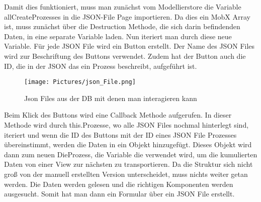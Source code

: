 \documentclass[a4paper,11pt]{scrreprt}
\begin{document}
Damit dies funktioniert, muss man zunächst vom Modellierstore die Variable allCreateProzesses in die JSON-File Page importieren. Da dies ein MobX Array ist, muss zunächst über die Destruction Methode, die sich darin befindenden Daten, in eine separate Variable laden. Nun iteriert man durch diese neue Variable. Für jede JSON File wird ein Button erstellt. Der Name des JSON Files wird zur Beschriftung des Buttons verwendet. 
Zudem hat der Button auch die ID, die in der JSON das ein Prozess beschreibt, aufgeführt ist. 
\begin{figure}[ht]
\centering
\texttt{[image: Pictures/json\_File.png]}
\caption{Json Files aus der DB mit denen man interagieren kann}
\label{JSON Files aus der Datenbank}
\end{figure}
\hfill \break

Beim Klick des Buttons wird eine Callback Methode aufgerufen. In dieser Methode wird durch this.Prozesse, wo alle JSON Files nochmal hinterlegt sind, iteriert und wenn die ID des Buttons mit der ID eines JSON File Prozesses übereinstimmt, werden die Daten in ein Objekt hinzugefügt. Dieses Objekt wird dann zum neuen DieProzess, die Variable die verwendet wird, um die kumulierten Daten von einer View zur nächsten zu transportieren. Da die Struktur sich nicht groß von der manuell erstellten Version unterscheidet, muss nichts weiter getan werden. Die Daten werden gelesen und die richtigen Komponenten werden ausgesucht. Somit hat man dann ein Formular über ein JSON File erstellt. 
\end{document}
